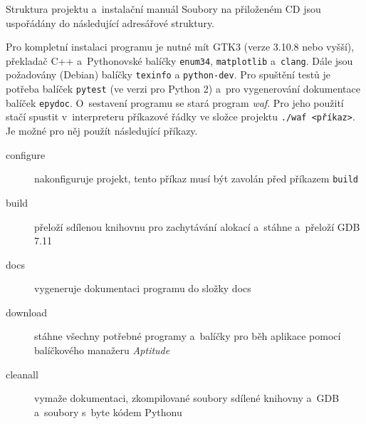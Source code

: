 \documentclass[czech,bachelor,male,python,dept460,hidelinks]{diploma}						%
\newcommand{\parspace}[1][]{
	\ifthenelse{\isempty{#1}}{\vspace{0mm}}{\vspace{#1}}
	\par
}
\begin{document}
\appendix
\begin{section}{Struktura projektu a~instalační manuál}
\label{appendix:manual}
	Soubory na přiloženém CD jsou uspořádány do následující adresářové struktury.
	
	\vspace{5mm}
	
	
	\parspace Pro kompletní instalaci programu je nutné mít GTK3 (verze 3.10.8 nebo vyšší), překladač C++ a~Pythonovské balíčky \texttt{enum34},
	\texttt{matplotlib} a~\texttt{clang}. Dále jsou požadovány (Debian) balíčky \texttt{texinfo} a \texttt{python-dev}.
	Pro spuštění testů je potřeba balíček \texttt{pytest} (ve verzi pro Python 2)
	a~pro vygenerování dokumentace balíček \texttt{epydoc}. O~sestavení programu se stará program \textit{waf}. Pro jeho použití stačí spustit v~interpreteru
	příkazové řádky ve složce projektu \texttt{./waf <příkaz>}. Je možné pro něj použít následující příkazy.
	
	\begin{description}
		\item[configure] nakonfiguruje projekt, tento příkaz musí být zavolán před příkazem \texttt{build}
		\item[build] přeloží sdílenou knihovnu pro zachytávání alokací a~stáhne a~přeloží GDB 7.11
		\item[docs] vygeneruje dokumentaci programu do složky docs
		\item[download] stáhne všechny potřebné programy a~balíčky pro běh aplikace pomocí balíčkového manažeru \textit{Aptitude}
		\item[cleanall] vymaže dokumentaci, zkompilované soubory sdílené knihovny a~GDB a~soubory s~byte kódem Pythonu
	\end{description}
	

\end{section}
\end{document}

